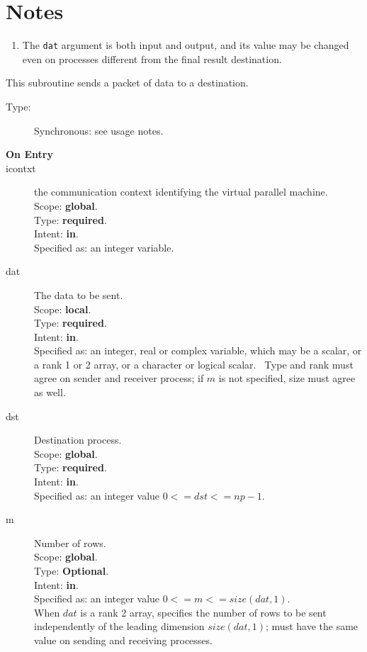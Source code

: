\section*{Notes}
\begin{enumerate}
\item The \verb|dat| argument is both input and output, and its
  value may be changed even on processes different from the final
  result destination.
\end{enumerate}




This subroutine sends a packet of data to a destination.
\begin{description}
\item[Type:] Synchronous: see usage notes. 
\item[\bf  On Entry ]
\item[icontxt] the communication context identifying the virtual
  parallel machine.\\
Scope: {\bf global}.\\
Type: {\bf required}.\\
Intent: {\bf in}.\\
Specified as: an integer variable.
\item[dat] The data to be sent.\\
Scope: {\bf local}.\\
Type: {\bf required}.\\
Intent: {\bf in}.\\
Specified as: an integer, real or complex variable, which may be a
scalar, or a rank 1 or 2 array, or a character or logical scalar. \
Type and  rank must agree on sender and receiver process; if $m$ is
not specified, size must agree as well. 
\item[dst] Destination process.\\
Scope: {\bf global}.\\
Type: {\bf required}.\\
Intent: {\bf in}.\\
Specified as: an integer value $0<= dst <= np-1$. \\
\item[m] Number of rows.\\
Scope: {\bf global}.\\
Type: {\bf Optional}.\\
Intent: {\bf in}.\\
Specified as: an integer value $0<= m <= size(dat,1)$. \\
When $dat$ is a rank 2 array, specifies the number of rows to be sent
independently of the leading dimension $size(dat,1)$; must have the
same value on sending and receiving processes.
\end{description}


